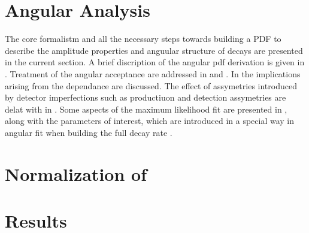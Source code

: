 

\section{Angular Analysis}
\label{Angular_Analysis}
 
The core formalistm and all the necessary steps towards building a PDF to describe the amplitude properties and anguular structure of \BJpsiKst decays are presented in
the current section. A brief discription of the angular pdf derivation is given in .
Treatment of the angular acceptance are addressed in  and .
In  the implications arising from the \mkpi dependance are discussed.
The effect of assymetries introduced by detector imperfections such as productiuon and detection assymetries are delat with
in . Some aspects of the maximum likelihood fit are presented in ,
along with the \ACP parameters of interest, which are introduced in a special way in angular fit when building the full decay rate \pdf.



\section{Normalization of \BsJpsiKpi}
\label{Normalization}

\section{Results}
\label{Results}

